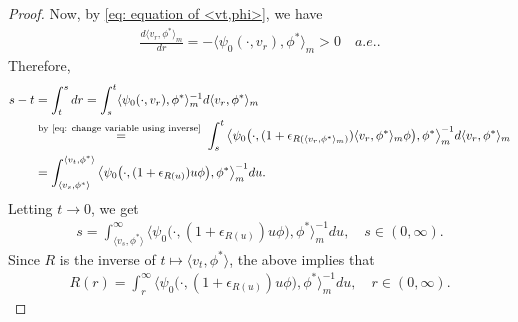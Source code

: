 \documentclass[12pt,a4paper]{amsart}
\theoremstyle{definition}
\numberwithin{equation}{section}
\begin{document}
\begin{proof}
	Now, by \eqref{eq: equation of <vt,phi>}, we have
  \begin{align}
    \frac{d \langle v_r, \phi^* \rangle_m}{dr}
    = - \langle \psi_0(\cdot ,v_r) ,\phi^*\rangle_m
    > 0
    \quad a.e..
  \end{align}
	Therefore,
  \begin{align}
    s-t
    & = \int_t^s dr
      = \int_s^t \langle \psi_0(\cdot ,v_r), \phi^*\rangle _m^{-1} d\langle v_r ,\phi^* \rangle_m
        \\ & \overset{\text{by \eqref{eq: change variable using inverse} }}{=} \int_s^t \big\langle \psi_0\big( \cdot ,(1+ \epsilon_{R(\langle v_r,\phi^* \rangle_m)})\langle v_r,\phi^*\rangle_m \phi \big), \phi^* \big\rangle_m^{-1} d\langle v_r ,\phi^* \rangle_m
    \\ & = \int_{\langle v_s,\phi^*\rangle}^{\langle v_t, \phi^* \rangle} \big\langle \psi_0 \big( \cdot ,( 1 + \epsilon_{R(u)} ) u \phi \big), \phi^* \big\rangle_m^{-1} du.
  \end{align}
	Letting $t\to 0$, we get
  \begin{align}
    s
    = \int_{\langle v_s,\phi^*\rangle}^\infty \big\langle \psi_0 \big(\cdot ,( 1 + \epsilon_{R(u)} ) u \phi \big), \phi^* \big\rangle_m^{-1} du,
    \quad s\in (0,\infty).
\end{align}
Since $R$ is the inverse of $t\mapsto \langle v_t,\phi^*\rangle$, the above implies that
\begin{align}\label{eq: integral equation for R}
	R(r)
	= \int_r^\infty \big\langle \psi_0 \big(\cdot ,( 1 + \epsilon_{R(u)} ) u \phi \big), \phi^* \big\rangle_m^{-1} du,
	\quad r\in (0,\infty).
\end{align}
	

\end{proof}
\end{document}
